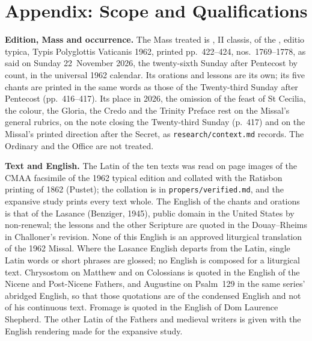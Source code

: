 
\section{Appendix: Scope and Qualifications}

{\footnotesize
\textbf{Edition, Mass and occurrence.} The Mass treated is , II classis, of the , editio typica, Typis Polyglottis Vaticanis 1962, printed
pp.~422--424, nos.~1769--1778, as said on Sunday 22~November 2026, the
twenty-sixth Sunday after Pentecost by count, in the universal 1962 calendar.
Its orations and lessons are its own; its five chants are printed in the same
words as those of the Twenty-third Sunday after Pentecost (pp.~416--417). Its
place in 2026, the omission of the feast of St Cecilia, the colour, the
Gloria, the Credo and the Trinity Preface rest on the Missal's general
rubrics, on the note closing the Twenty-third Sunday (p.~417) and on the
Missal's printed direction after the Secret, as \texttt{research/context.md}
records. The Ordinary and the Office are not treated.

\textbf{Text and English.} The Latin of the ten texts was read on page images
of the CMAA facsimile of the 1962 typical edition and collated with the
Ratisbon printing of 1862 (Pustet); the collation is in
\texttt{propers/verified.md}, and the expansive study prints every text whole.
The English of the chants and orations is that of the Lasance  (Benziger, 1945), public domain in the United States by non-renewal;
the lessons and the other Scripture are quoted in the Douay--Rheims in
Challoner's revision. None of this English is an approved liturgical
translation of the 1962 Missal. Where the Lasance English departs from the
Latin, single Latin words or short phrases are glossed; no English is composed
for a liturgical text. Chrysostom on Matthew and on Colossians is quoted in the
English of the Nicene and Post-Nicene Fathers, and Augustine on Psalm~129 in
the same series' abridged English, so that those quotations are of the
condensed English and not of his continuous text. Fromage is quoted in the
English of Dom Laurence Shepherd. The other Latin of the Fathers and medieval
writers is given with the English rendering made for the expansive study.

}
